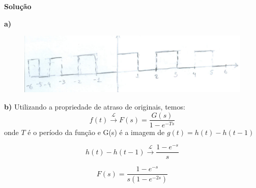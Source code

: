 \linespread{1.5}

\textbf{Solução}

\textbf{a)}
\begin{figure}[H]
    \centering
    \includegraphics[width=0.7\linewidth]{fig/tl4.png}
\end{figure}

\textbf{b)}
Utilizando a propriedade de atraso de originais, temos:
\begin{equation*}
    f(t) \xrightarrow{\mathcal{L}} F(s) = \frac{G(s)}{1-e^{-Ts}}
\end{equation*}
onde $T$ é o período da função e G(s) é a imagem de $g(t) = h(t) - h(t-1)$

\begin{equation*}
    h(t) - h(t-1) \xrightarrow{\mathcal{L}} \frac{1-e^{-s}}{s}
\end{equation*}

\begin{equation*}
    \boxed{F(s) = \frac{1-e^{-s}}{s(1-e^{-2s})}}
\end{equation*}